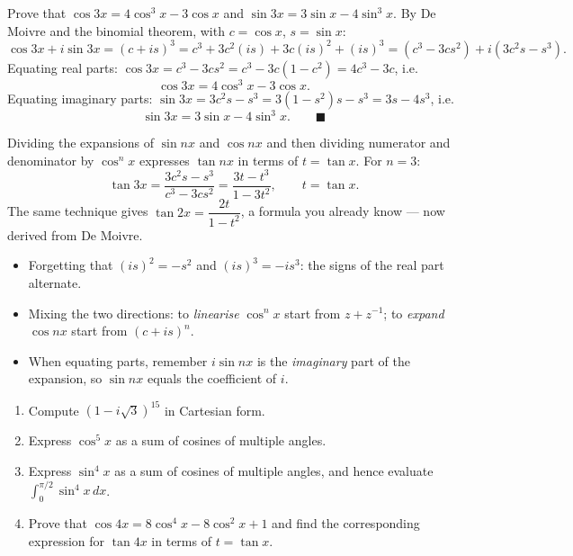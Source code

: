 \documentclass[11pt]{article}
\begin{document}
\begin{exoresolu}
Prove that $\cos 3x = 4\cos^3 x - 3\cos x$ and $\sin 3x = 3\sin x - 4\sin^3 x$.
\tcblower
By De Moivre and the binomial theorem, with $c = \cos x$, $s = \sin x$:
\[ \cos 3x + i\sin 3x = (c + is)^3 = c^3 + 3c^2(is) + 3c(is)^2 + (is)^3 = (c^3 - 3cs^2) + i(3c^2s - s^3). \]
Equating real parts: $\cos 3x = c^3 - 3cs^2 = c^3 - 3c(1 - c^2) = 4c^3 - 3c$, i.e.
\[ \boxed{\cos 3x = 4\cos^3 x - 3\cos x}. \]
Equating imaginary parts: $\sin 3x = 3c^2s - s^3 = 3(1 - s^2)s - s^3 = 3s - 4s^3$, i.e.
\[ \boxed{\sin 3x = 3\sin x - 4\sin^3 x}. \qquad \blacksquare \]
\end{exoresolu}

\begin{exemplebox}
Dividing the expansions of $\sin nx$ and $\cos nx$ and then dividing numerator and denominator by $\cos^n x$ expresses $\tan nx$ in terms of $t = \tan x$. For $n = 3$:
\[ \tan 3x = \frac{3c^2s - s^3}{c^3 - 3cs^2} = \frac{3t - t^3}{1 - 3t^2}, \qquad t = \tan x. \]
The same technique gives $\tan 2x = \dfrac{2t}{1 - t^2}$, a formula you already know — now derived from De Moivre.
\end{exemplebox}

\begin{attention}
\begin{itemize}
\item Forgetting that $(is)^2 = -s^2$ and $(is)^3 = -is^3$: the signs of the real part alternate.
\item Mixing the two directions: to \emph{linearise} $\cos^n x$ start from $z + z^{-1}$; to \emph{expand} $\cos nx$ start from $(c + is)^n$.
\item When equating parts, remember $i\sin nx$ is the \emph{imaginary} part of the expansion, so $\sin nx$ equals the coefficient of $i$.
\end{itemize}
\end{attention}

\begin{exercice}[Practice]
\begin{enumerate}
\item Compute $(1 - i\sqrt{3})^{15}$ in Cartesian form.
\item Express $\cos^5 x$ as a sum of cosines of multiple angles.
\item Express $\sin^4 x$ as a sum of cosines of multiple angles, and hence evaluate $\displaystyle\int_0^{\pi/2} \sin^4 x\, dx$.
\item Prove that $\cos 4x = 8\cos^4 x - 8\cos^2 x + 1$ and find the corresponding expression for $\tan 4x$ in terms of $t = \tan x$.
\end{enumerate}
\end{exercice}
\end{document}
